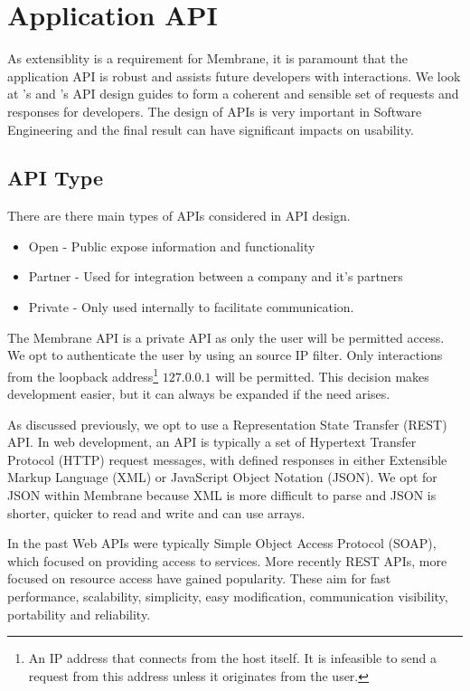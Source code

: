 \documentclass[11pt, a4paper, twoside]{report}
\begin{document}
\section{Application API}

As extensiblity is a requirement for Membrane, it is paramount that the application API is robust and assists future developers with interactions. We look at \cite{google2017api}'s and \cite{heroku2017api}'s API design guides to form a coherent and sensible set of requests and responses for developers. The design of APIs is very important in Software Engineering and the final result can have significant impacts on usability. \citep{benslimane2008services} 

\subsection{API Type}

There are there main types of APIs considered in API design. \citep{boyd2017api}

\begin{itemize}
 \item Open - Public expose information and functionality
 \item Partner - Used for integration between a company and it's partners
 \item Private - Only used internally to facilitate communication.
\end{itemize}

The Membrane API is a private API as only the user will be permitted access. We opt to authenticate the user by using an source IP filter. Only interactions from the loopback address\footnote{An IP address that connects from the host itself. \citep{hinden2006ip} It is infeasible to send a request from this address unless it originates from the user.} $127.0.0.1$ will be permitted. This decision makes development easier, but it can always be expanded if the need arises.

As discussed previously, we opt to use a Representation State Transfer (REST) API. In web development, an API is typically a set of Hypertext Transfer Protocol (HTTP) request messages, with defined responses in either Extensible Markup Language (XML) or JavaScript Object Notation (JSON). We opt for JSON within Membrane because XML is more difficult to parse and JSON is shorter, quicker to read and write and can use arrays.

In the past Web APIs were typically Simple Object Access Protocol (SOAP), which focused on providing access to services. \citep{benslimane2008services} More recently REST APIs, more focused on resource access have gained popularity. These aim for fast performance, scalability, simplicity, easy modification, communication visibility, portability and reliability. \citep{fielding2000architectural}
\end{document}
